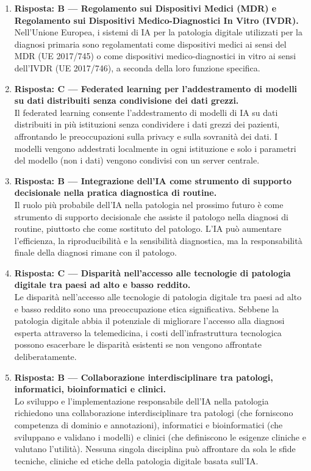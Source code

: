 \begin{enumerate}
    \item \textbf{Risposta: B --- Regolamento sui Dispositivi Medici (MDR) e Regolamento sui
    Dispositivi Medico-Diagnostici In Vitro (IVDR).}\\
    Nell'Unione Europea, i sistemi di IA per la patologia digitale utilizzati per la diagnosi
    primaria sono regolamentati come dispositivi medici ai sensi del MDR (UE 2017/745) o come
    dispositivi medico-diagnostici in vitro ai sensi dell'IVDR (UE 2017/746), a seconda della
    loro funzione specifica.

    \item \textbf{Risposta: C --- Federated learning per l'addestramento di modelli su dati
    distribuiti senza condivisione dei dati grezzi.}\\
    Il federated learning consente l'addestramento di modelli di IA su dati distribuiti in più
    istituzioni senza condividere i dati grezzi dei pazienti, affrontando le preoccupazioni sulla
    privacy e sulla sovranità dei dati. I modelli vengono addestrati localmente in ogni istituzione
    e solo i parametri del modello (non i dati) vengono condivisi con un server centrale.

    \item \textbf{Risposta: B --- Integrazione dell'IA come strumento di supporto decisionale
    nella pratica diagnostica di routine.}\\
    Il ruolo più probabile dell'IA nella patologia nel prossimo futuro è come strumento di
    supporto decisionale che assiste il patologo nella diagnosi di routine, piuttosto che come
    sostituto del patologo. L'IA può aumentare l'efficienza, la riproducibilità e la sensibilità
    diagnostica, ma la responsabilità finale della diagnosi rimane con il patologo.

    \item \textbf{Risposta: C --- Disparità nell'accesso alle tecnologie di patologia digitale
    tra paesi ad alto e basso reddito.}\\
    Le disparità nell'accesso alle tecnologie di patologia digitale tra paesi ad alto e basso
    reddito sono una preoccupazione etica significativa. Sebbene la patologia digitale abbia il
    potenziale di migliorare l'accesso alla diagnosi esperta attraverso la telemedicina, i costi
    dell'infrastruttura tecnologica possono esacerbare le disparità esistenti se non vengono
    affrontate deliberatamente.

    \item \textbf{Risposta: B --- Collaborazione interdisciplinare tra patologi, informatici,
    bioinformatici e clinici.}\\
    Lo sviluppo e l'implementazione responsabile dell'IA nella patologia richiedono una
    collaborazione interdisciplinare tra patologi (che forniscono competenza di dominio e
    annotazioni), informatici e bioinformatici (che sviluppano e validano i modelli) e clinici
    (che definiscono le esigenze cliniche e valutano l'utilità). Nessuna singola disciplina può
    affrontare da sola le sfide tecniche, cliniche ed etiche della patologia digitale basata
    sull'IA.

\end{enumerate}
